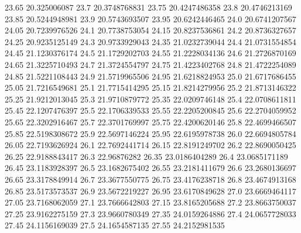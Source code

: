          23.65     20.325006087
           23.7    20.3748768831
          23.75    20.4247486358
           23.8    20.4746213169
          23.85    20.5244948981
           23.9    20.5743693507
          23.95    20.6242446465
           24.0    20.6741207567
          24.05    20.7239976526
           24.1    20.7738753054
          24.15    20.8237536861
           24.2    20.8736327657
          24.25    20.9235125149
           24.3    20.9733929043
          24.35    21.0232739044
           24.4    21.0731554854
          24.45    21.1230376174
           24.5    21.1729202703
          24.55    21.2228034136
           24.6    21.2726870169
          24.65    21.3225710493
           24.7    21.3724554797
          24.75    21.4223402768
           24.8    21.4722254089
          24.85    21.5221108443
           24.9    21.5719965506
          24.95    21.6218824953
           25.0    21.6717686455
          25.05    21.7216549681
           25.1    21.7715414295
          25.15    21.8214279956
           25.2    21.8713146322
          25.25    21.9212013045
           25.3    21.9710879772
          25.35    22.0209746148
           25.4    22.0708611811
          25.45    22.1207476397
           25.5    22.1706339533
          25.55    22.2205200845
           25.6    22.2704059952
          25.65    22.3202916467
           25.7    22.3701769997
          25.75    22.4200620146
           25.8    22.4699466507
          25.85    22.5198308672
           25.9    22.5697146224
          25.95    22.6195978738
           26.0    22.6694805784
          26.05    22.7193626924
           26.1    22.7692441714
          26.15    22.8191249702
           26.2    22.8690050425
          26.25    22.9188843417
           26.3      22.96876282
          26.35    23.0186404289
           26.4    23.0685171189
          26.45    23.1183928397
           26.5    23.1682675402
          26.55    23.2181411679
           26.6    23.2680136697
          26.65    23.3178849914
           26.7    23.3677550775
          26.75    23.4176238718
           26.8    23.4674913168
          26.85    23.5173573537
           26.9    23.5672219227
          26.95    23.6170849628
           27.0    23.6669464117
          27.05    23.7168062059
           27.1    23.7666642803
          27.15    23.8165205688
           27.2    23.8663750037
          27.25    23.9162275159
           27.3    23.9660780349
          27.35    24.0159264886
           27.4    24.0657728033
          27.45    24.1156169039
           27.5    24.1654587135
          27.55    24.2152981535
